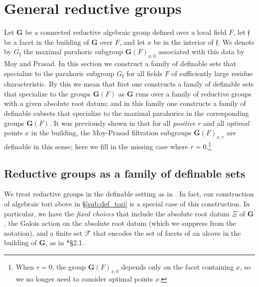 \documentclass{amsart}
\newcommand{\cF}{\mathcal{F}}
\newcommand{\bG}{\mathbf{G}}
\newcommand{\ff}{{\mathfrak f}}
\theoremstyle{plain}
\theoremstyle{definition}
\begin{document}
\section{General reductive groups}
Let $\bG$ be a connected reductive algebraic group defined over a local field $F$,
let $\ff$ be a facet in the building of $\bG$ over $F$, and let $x$ be in the interior of $\ff$. 
We denote by $G_\ff$ the maximal parahoric subgroup $\bG(F)_{x, 0}$ associated with this data
by Moy and Prasad.
In this section we construct a family of definable sets that specialize to the parahoric subgroup ${G}_{\ff}$
for all fields $F$ of sufficiently large residue characteristic. By this we mean that first one constructs a family of definable sets that specialize to the groups $\bG(F)$ as $\bG$ runs over a family of reductive groups with a given absolute root datum; and in this family one constructs a family of definable subsets that specialize to the maximal parahorics in the corresponding groups $\bG(F)$.
It was previously shown in \cite{cluckers-gordon-halupczok:14b} that for all \emph{positive} $r$ and all \emph{optimal} points $x$ in the building,
the Moy-Prasad filtration subgroups ${\bG}(F)_{x, r}$ are definable in this sense; here we fill in the missing case where
$r=0$.\footnote{When $r=0$, the group ${\bG}(F)_{x,0}$ depends only on the facet containing $x$,
so we no longer need to consider optimal points $x$.}

\subsection{Reductive groups as a family of definable sets}
We treat reductive groups in the definable setting as in \cite{gordon-hales:15a}.
In fact, our construction of algebraic tori above in \S \ref{sub:def_tori} is a special case of this construction.
In particular, we have the \emph{fixed choices} that include the absolute root datum $\Xi$ of $\bG$, the Galois action on the absolute root datum (which we suppress from the notation), and a finite set $\cF$ that encodes
the set of facets of an alcove in the building of $\bG$, as in \cite{gordon-hales:15a}*{\S 2.1}.
\end{document}
